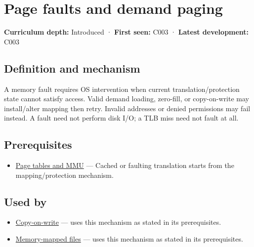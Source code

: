 \hypertarget{appendix-cc0909a7ef14}{}\label{referencestart:appendix-cc0909a7ef14}
\section{Page faults and demand paging}\label{appendix-cc0909a7ef14-page-faults-and-demand-paging}

\textbf{Curriculum depth:} Introduced · \textbf{First seen:} C003 · \textbf{Latest development:} C003

\begin{allmightroledefinition}

\subsection{Definition and mechanism}\label{appendix-cc0909a7ef14-definition-and-mechanism}

A memory fault requires OS intervention when current translation/protection state cannot satisfy access. Valid demand loading, zero-fill, or copy-on-write may install/alter mapping then retry. Invalid addresses or denied permissions may fail instead. A fault need not perform disk I/O; a TLB miss need not fault at all.

\end{allmightroledefinition}

\subsection{Prerequisites}\label{appendix-cc0909a7ef14-prerequisites}

\begin{itemize}
\tightlist
\item
  \hyperref[appendix-01e5905165c4]{Page tables and MMU} --- Cached or faulting translation starts from the mapping/protection mechanism.
\end{itemize}

\subsection{Used by}\label{appendix-cc0909a7ef14-used-by}

\begin{itemize}
\tightlist
\item
  \hyperref[appendix-7a06e5baac04]{Copy-on-write} --- uses this mechanism as stated in its prerequisites.
\item
  \hyperref[appendix-313ee7a0ba7b]{Memory-mapped files} --- uses this mechanism as stated in its prerequisites.
\end{itemize}


